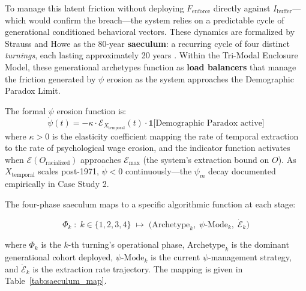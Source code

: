 To manage this latent friction without deploying $F_{\text{enforce}}$ directly against $I_{\text{buffer}}$---which would confirm the breach---the system relies on a predictable cycle of generational conditioned behavioral vectors. These dynamics are formalized by Strauss and Howe as the 80-year \textbf{saeculum}: a recurring cycle of four distinct \textit{turnings}, each lasting approximately 20 years \cite{strauss_howe_1997, strauss_howe_1991}. Within the Tri-Modal Enclosure Model, these generational archetypes function as \textbf{load balancers} that manage the friction generated by $\psi$ erosion as the system approaches the Demographic Paradox Limit.

The formal $\psi$ erosion function is:
\begin{equation}\label{eq:10.18-psi-degradation-function}
\dot{\psi}(t) = -\kappa \cdot \mathcal{E}_{X_{\text{temporal}}}(t) \cdot \mathbf{1}\bigl[\text{Demographic Paradox active}\bigr]
\end{equation}
where $\kappa > 0$ is the elasticity coefficient mapping the rate of temporal extraction to the rate of psychological wage erosion, and the indicator function activates when $\mathcal{E}(O_{\text{racialized}})$ approaches $\mathcal{E}_{\max}$ (the system's extraction bound on $O$). As $X_{\text{temporal}}$ scales post-1971, $\dot{\psi} < 0$ continuously---the $\psi_m$ decay documented empirically in Case Study 2.

The four-phase saeculum maps to a specific algorithmic function at each stage:

\begin{equation}\label{eq:10.19-saeculum-phase-map}
\Phi_k \;:\; k \in \{1,2,3,4\} \;\longmapsto\; \bigl(\mathrm{Archetype}_k,\;\psi\text{-Mode}_k,\;\dot{\mathcal{E}}_k\bigr)
\end{equation}

\noindent where $\Phi_k$ is the $k$-th turning's operational phase, $\mathrm{Archetype}_k$ is the dominant generational cohort deployed, $\psi\text{-Mode}_k$ is the current $\psi$-management strategy, and $\dot{\mathcal{E}}_k$ is the extraction rate trajectory. The mapping is given in Table~\ref{tab:saeculum_map}.

